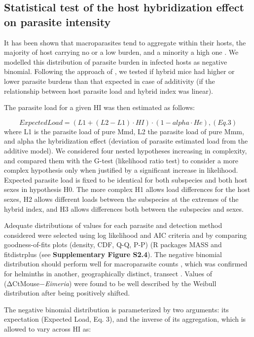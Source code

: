 \subsection{Statistical test of the host hybridization effect on parasite intensity}
It has been shown that macroparasites tend to aggregate within their hosts, the majority of host carrying no or a low burden, and a minority a high one \citep{shaw_patterns_1995}. We modelled this distribution of parasite burden in infected hosts as negative binomial. Following the approach of \cite{baird_where_2012}, we tested if hybrid mice had higher or lower parasite burdens than that expected in case of additivity (if the relationship between host parasite load and hybrid index was linear). 
\par The parasite load for a given HI was then estimated as follows:

\[ExpectedLoad=(L1 + (L2 − L1) · HI) · (1 − alpha · He) ,           (Eq. 3)\]
where L1 is the parasite load of pure Mmd, L2 the parasite load of pure Mmm, and alpha the hybridization effect (deviation of parasite estimated load from the additive model). We considered four nested hypotheses increasing in complexity, and compared them with the G-test (likelihood ratio test) to consider a more complex hypothesis only when justified by a significant increase in likelihood. Expected parasite load is fixed to be identical for both subspecies and both host sexes in hypothesis H0. The more complex H1 allows load differences for the host sexes, H2 allows different loads between the subspecies at the extremes of the hybrid index, and H3 allows differences both between the subspecies and sexes.
\par Adequate distributions of values for each parasite and detection method considered were selected using log likelihood and AIC criteria and by comparing goodness-of-fits plots (density, CDF, Q-Q, P-P) (R packages MASS \citep{venables_modern_2002} and fitdistrplus \citep{delignette-muller_fitdistrplus_2015} (see \textbf{Supplementary Figure S2.4}). The negative binomial distribution should perform well for macroparasite counts \citep{crofton_quantitative_1971, shaw_patterns_1995}, which was confirmed for helminths in another, geographically distinct, transect \citep{baird_where_2012}. Values of (ΔCtMouse−\textit{Eimeria}) were found to be well described by the Weibull distribution after being positively shifted. 
\par The negative binomial distribution is parameterized by two arguments: its expectation (Expected Load, Eq. 3), and the inverse of its aggregation, which is allowed to vary across HI as:

